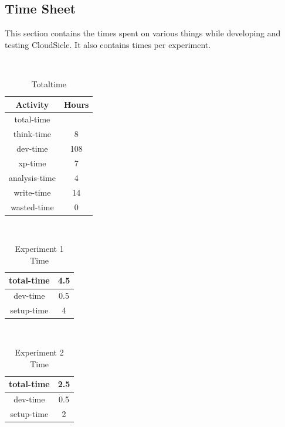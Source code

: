 \documentclass[twocolumn,twoside]{IEEEtran}
\begin{document}
\begin{appendices}
\section{Time Sheet}
This section contains the times spent on various things while developing
and testing CloudSicle. It also contains times per experiment.
\begin{table}[htb]
\caption{Totaltime}
\begin{center}
{\tt
\begin{tabular}{|c|c|}
\hline
Activity&Hours\\\hline\hline
total-time&\\\hline
think-time&8\\\hline
dev-time&108\\\hline
xp-time&7\\\hline
analysis-time&4\\\hline
write-time&14\\\hline
wasted-time&0\\\hline
\end{tabular}
} 
\end{center}
\end{table}
\begin{table}[htb]
\caption{Experiment 1 Time}
\begin{center}
{\tt
\begin{tabular}{|c|c|}
\hline
total-time&4.5\\\hline
dev-time&0.5\\\hline
setup-time&4\\\hline
\end{tabular}
} 
\end{center}
\end{table}
\begin{table}[htb]
\caption{Experiment 2 Time}
\begin{center}
{\tt
\begin{tabular}{|c|c|}
\hline
total-time&2.5\\\hline
dev-time&0.5\\\hline
setup-time&2\\\hline
\end{tabular}
} 
\end{center}
\end{table}

\end{appendices}

\nocite{*}

\end{document}
